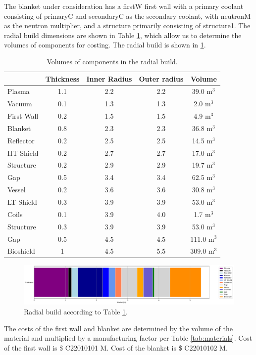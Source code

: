 The blanket under consideration has a firstW first wall with a primary coolant consisting of primaryC and secondaryC as the secondary coolant, with neutronM as the neutron multiplier, and a structure primarily consisting of structure1. The radial build dimensions are shown in Table \ref{tab:volumes}, which allow us to determine the volumes of components for costing.  The radial build is shown in \ref{fig:radial}.  \\


\begin{table}[h!]
    \centering
    \begin{tabular}{l c  c c c}
    \hline
        &	Thickness	&	Inner Radius	&	Outer radius	&	Volume		\\
        \hline
Plasma	&	1.1	&	2.2	&	2.2	&	39.0	m$^{3}$	\\
Vacuum	&	0.1	&	1.3	&	1.3	&	2.0	m$^{3}$	\\
First Wall	&	0.2	&	1.5	&	1.5	&	4.9	m$^{3}$	\\
Blanket	&	0.8	&	2.3	&	2.3	&	36.8	m$^{3}$	\\
Reflector	&	0.2	&	2.5	&	2.5	&	14.5	m$^{3}$	\\
HT Shield	&	0.2	&	2.7	&	2.7	&	17.0	m$^{3}$	\\
Structure	&	0.2	&	2.9	&	2.9	&	19.7	m$^{3}$	\\
Gap	&	0.5	&	3.4	&	3.4	&	62.5	m$^{3}$	\\
Vessel	&	0.2	&	3.6	&	3.6	&	30.8	m$^{3}$	\\
LT Shield	&	0.3	&	3.9	&	3.9	&	53.0	m$^{3}$	\\
Coils	&	0.1	&	3.9	&	4.0	&	1.7	m$^{3}$	\\
Structure	&	0.3	&	3.9	&	3.9	&	53.0	m$^{3}$	\\
Gap	&	0.5	&	4.5	&	4.5	&	111.0	m$^{3}$	\\
Bioshield	&	1	&	4.5	&	5.5	&	309.0	m$^{3}$	\\

        \hline
    \end{tabular}
    \caption{Volumes of components in the radial build.}
    \label{tab:volumes}
\end{table}

\begin{figure}
    \centering
    \includegraphics[width=0.9\linewidth]{Figures/radial_build.pdf}
    \caption{Radial build according to Table \ref{tab:volumes}.}
    \label{fig:radial}
\end{figure}



The costs of the first wall and blanket are determined by the volume of the material and multiplied by a manufacturing factor per Table \ref{tab:materials}.   Cost of the first wall is \$ C22010101 M.  Cost of the blanket is \$ C22010102 M.


